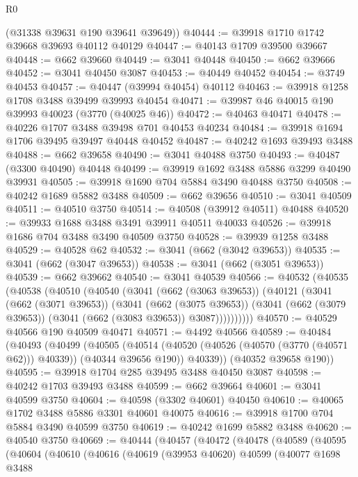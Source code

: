 \begin{lexlean}{R0}
\begin{coremodule}
      (@31338 @39631 @190 @39641 @39649))
@40444 := @39918 @1710 @1742 @39668 @39693 @40112 @40129
@40447 := @40143 @1709 @39500 @39667
@40448 := @662 @39660
@40449 := @3041 @40448
@40450 := @662 @39666
@40452 := @3041 @40450 @3087
@40453 := @40449 @40452
@40454 := @3749 @40453
@40457 := @40447 (@39994 @40454) @40112
@40463 := @39918 @1258 @1708 @3488 @39499 @39993 @40454
@40471 := @39987 @46 @40015 @190 @39993 @40023 (@3770 (@40025 @46))
@40472 := @40463 @40471
@40478 := @40226 @1707 @3488 @39498 @701 @40453 @40234
@40484 := @39918 @1694 @1706 @39495 @39497 @40448 @40452
@40487 := @40242 @1693 @39493 @3488
@40488 := @662 @39658
@40490 := @3041 @40488 @3750
@40493 := @40487 (@3300 @40490) @40448
@40499 := @39919 @1692 @3488 @5886 @3299 @40490 @39931
@40505 := @39918 @1690 @704 @5884 @3490 @40488 @3750
@40508 := @40242 @1689 @5882 @3488
@40509 := @662 @39656
@40510 := @3041 @40509
@40511 := @40510 @3750
@40514 := @40508 (@39912 @40511) @40488
@40520 := @39933 @1688 @3488 @3491 @39911 @40511 @40033
@40526 := @39918 @1686 @704 @3488 @3490 @40509 @3750
@40528 := @39939 @1258 @3488
@40529 := @40528 @62
@40532 := @3041 (@662 (@3042 @39653))
@40535 := @3041 (@662 (@3047 @39653))
@40538 := @3041 (@662 (@3051 @39653))
@40539 := @662 @39662
@40540 := @3041 @40539
@40566 := @40532
    (@40535
      (@40538
        (@40510
          (@40540
            (@3041
              (@662 (@3063 @39653))
              (@40121
                (@3041
                  (@662 (@3071 @39653))
                  (@3041
                    (@662 (@3075 @39653))
                    (@3041 (@662 (@3079 @39653)) (@3041 (@662 (@3083 @39653)) @3087))))))))))
@40570 := @40529 @40566 @190 @40509 @40471
@40571 := @4492 @40566
@40589 := @40484
    (@40493
      (@40499
        (@40505
          (@40514 (@40520 (@40526 (@40570 (@3770 (@40571 @62))) @40339)) (@40344 @39656 @190))
          @40339))
      (@40352 @39658 @190))
@40595 := @39918 @1704 @285 @39495 @3488 @40450 @3087
@40598 := @40242 @1703 @39493 @3488
@40599 := @662 @39664
@40601 := @3041 @40599 @3750
@40604 := @40598 (@3302 @40601) @40450
@40610 := @40065 @1702 @3488 @5886 @3301 @40601 @40075
@40616 := @39918 @1700 @704 @5884 @3490 @40599 @3750
@40619 := @40242 @1699 @5882 @3488
@40620 := @40540 @3750
@40669 := @40444
    (@40457
      (@40472
        (@40478
          (@40589
            (@40595
              (@40604
                (@40610
                  (@40616
                    (@40619
                      (@39953 @40620)
                      @40599
                      (@40077
                        @1698
                        @3488

\end{coremodule}
\end{lexlean}
